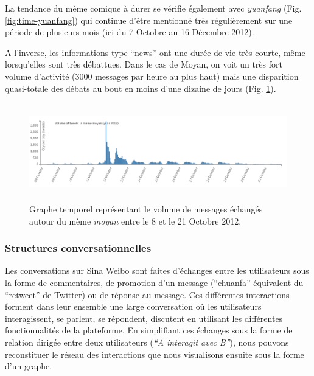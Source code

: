 La tendance du m\`eme comique \`a durer se v\'erifie \'egalement avec
\textit{yuanfang} (Fig. \ref{fig:time-yuanfang}) qui continue d{\textquoteright}\^etre mentionn\'e
tr\`es r\'eguli\`erement sur une p\'eriode de plusieurs mois (ici du 7
Octobre au 16 D\'ecembre 2012).

A l{\textquoteright}inverse, les informations type {\textquotedblleft}news{\textquotedblright} ont une dur\'ee de vie tr\`es courte, m\^eme lorsqu{\textquoteright}elles sont tr\`es d\'ebattues. Dans le cas de Moyan, on voit un tr\`es fort volume d{\textquoteright}activit\'e (3000 messages par heure au plus haut) mais une disparition quasi-totale des d\'ebats au bout en moins d{\textquoteright}une dizaine de jours (Fig. \ref{fig:time-moyan}).

\begin{figure}
    \centering
    \includegraphics[width=6.0087in,height=1.6697in]{figures/chap4/chapitre4-img6.png}
    \caption{
      Graphe temporel repr\'esentant le volume de messages \'echang\'es autour du m\`eme \textit{moyan} entre le 8 et le 21 Octobre 2012.
    }
    \label{fig:time-moyan}
\end{figure}

\subsubsection[Structures conversationnelles]{Structures conversationnelles}
Les conversations sur Sina Weibo sont faites d{\textquoteright}\'echanges entre les utilisateurs sous la forme de commentaires, de promotion d{\textquoteright}un message ({\textquotedblleft}chuanfa{\textquotedblright} \'equivalent du {\textquotedblleft}retweet{\textquotedblright} de Twitter) ou de r\'eponse au message. Ces diff\'erentes interactions forment dans leur ensemble une large conversation o\`u les utilisateurs interagissent, se parlent, se r\'epondent, discutent en utilisant les diff\'erentes fonctionnalit\'es de la plateforme. En simplifiant ces \'echanges sous la forme de relation dirig\'ee entre deux utilisateurs (\textit{{\textquotedblleft}A interagit avec B{\textquotedblright}}), nous pouvons reconstituer le r\'eseau des interactions que nous visualisons ensuite sous la forme d{\textquoteright}un graphe.  

